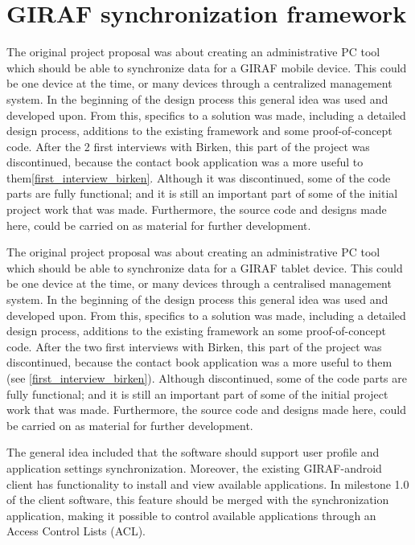 \section{GIRAF synchronization framework}

The original project proposal was about creating an administrative PC tool which should be able to synchronize data for a GIRAF mobile device. This could be one device at the time, or many devices through a centralized management system. In the beginning of the design process this general idea was used and developed upon. From this, specifics to a solution was made, including a detailed design process, additions to the existing framework and some proof-of-concept code. After the 2 first interviews with Birken, this part of the project was discontinued, because the contact book application was a more useful to them\vref{first_interview_birken}. Although it was discontinued, some of the code parts are fully functional; and it is still an important part of some of the initial project work that was made. Furthermore, the source code and designs made here, could be carried on as material for further development. 

The original project proposal was about creating an administrative PC tool which should be able to synchronize data for a GIRAF tablet device. This could be one device at the time, or many devices through a centralised management system. In the beginning of the design process this general idea was used and developed upon. From this, specifics to a solution was made, including a detailed design process, additions to the existing framework an some proof-of-concept code. After the two first interviews with Birken, this part of the project was discontinued, because the contact book application was a more useful to them (see \vref{first_interview_birken}). Although discontinued, some of the code parts are fully functional; and it is still an important part of some of the initial project work that was made. Furthermore, the source code and designs made here, could be carried on as material for further development. 

The general idea included that the software should support user profile and application settings synchronization. Moreover, the existing GIRAF-android client has functionality to install and view available applications. In milestone 1.0 of the client software, this feature should be merged with the synchronization application, making it possible to control available applications through an Access Control Lists (ACL).

